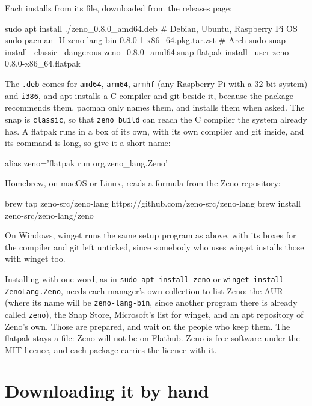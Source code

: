 Each installs from its file, downloaded from the releases page:

\begin{zenofrag}[lang=shell]
sudo apt install ./zeno_0.8.0_amd64.deb                     # Debian, Ubuntu, Raspberry Pi OS
sudo pacman -U zeno-lang-bin-0.8.0-1-x86_64.pkg.tar.zst          # Arch
sudo snap install --classic --dangerous zeno_0.8.0_amd64.snap
flatpak install --user zeno-0.8.0-x86_64.flatpak
\end{zenofrag}

The \verb|.deb| comes for \verb|amd64|, \verb|arm64|, \verb|armhf| (any
Raspberry Pi with a 32-bit system) and \verb|i386|, and apt installs a
C compiler and git beside it, because the package recommends them.
pacman only names them, and installs them when asked. The snap is
\verb|classic|, so that \verb|zeno build| can reach the C compiler the
system already has. A flatpak runs in a box of its own, with its own
compiler and git inside, and its command is long, so give it a short
name:

\begin{zenofrag}[lang=shell]
alias zeno='flatpak run org.zeno_lang.Zeno'
\end{zenofrag}

Homebrew, on macOS or Linux, reads a formula from the Zeno repository:

\begin{zenofrag}[lang=shell]
brew tap zeno-src/zeno-lang https://github.com/zeno-src/zeno-lang
brew install zeno-src/zeno-lang/zeno
\end{zenofrag}

On Windows, winget runs the same setup program as above, with its
boxes for the compiler and git left unticked, since somebody who uses
winget installs those with winget too.

Installing with one word, as in \verb|sudo apt install zeno| or
\verb|winget install ZenoLang.Zeno|, needs each manager's own
collection to list Zeno: the AUR (where its name will be
\verb|zeno-lang-bin|, since another program there is already called
\verb|zeno|), the Snap Store, Microsoft's list for winget, and an apt
repository of Zeno's own. Those are prepared, and wait on the people
who keep them. The flatpak stays a file: Zeno will not be on Flathub. Zeno is
free software under the MIT licence, and each package carries the
licence with it.

\section{Downloading it by hand}

